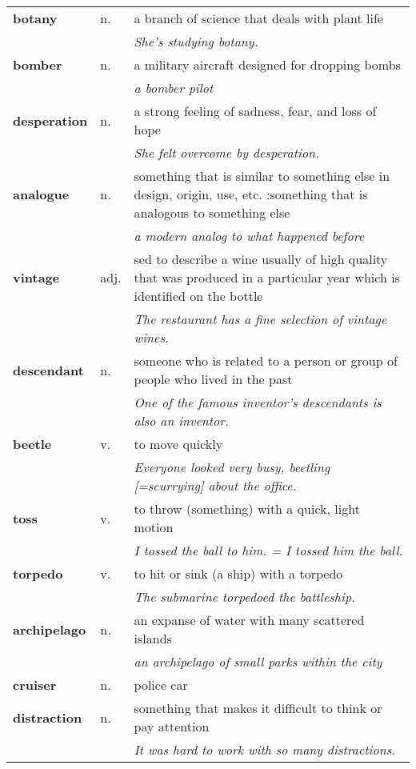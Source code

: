 \documentclass[a4paper]{article}
\begin{document}
\begin{longtable}{llp{11cm}}
\textbf{botany} & n. &  a branch of science that deals with plant life \\
 & & \textit{She's studying botany.}\\[0.08cm]
\textbf{bomber} & n. &  a military aircraft designed for dropping bombs \\
 & & \textit{a bomber pilot}\\[0.08cm]
\textbf{desperation} & n. &  a strong feeling of sadness, fear, and loss of hope \\
 & & \textit{She felt overcome by desperation.}\\[0.08cm]
\textbf{analogue} & n. &  something that is similar to something else in design, origin, use, etc. :something that is analogous to something else \\
 & & \textit{a modern analog to what happened before}\\[0.08cm]
\textbf{vintage} & adj. &  sed to describe a wine usually of high quality that was produced in a particular year which is identified on the bottle \\
 & & \textit{The restaurant has a fine selection of vintage wines.}\\[0.08cm]
\textbf{descendant} & n. &  someone who is related to a person or group of people who lived in the past \\
 & & \textit{One of the famous inventor's descendants is also an inventor.}\\[0.08cm]
\textbf{beetle} & v. &  to move quickly \\
 & & \textit{Everyone looked very busy, beetling [=scurrying] about the office.}\\[0.08cm]
\textbf{toss} & v. &  to throw (something) with a quick, light motion \\
 & & \textit{I tossed the ball to him. = I tossed him the ball.}\\[0.08cm]
\textbf{torpedo} & v. &  to hit or sink (a ship) with a torpedo \\
 & & \textit{The submarine torpedoed the battleship.}\\[0.08cm]
\textbf{archipelago} & n. &  an expanse of water with many scattered islands\\
 & & \textit{an archipelago of small parks within the city}\\[0.08cm]
\textbf{cruiser} & n. &  police car\\[0.08cm]
\textbf{distraction} & n. &  something that makes it difficult to think or pay attention \\
 & & \textit{It was hard to work with so many distractions.}\\[0.08cm]

\end{longtable}
\end{document}
